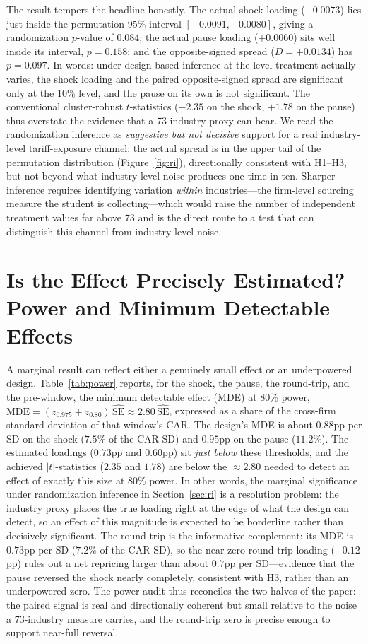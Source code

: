 \documentclass[12pt]{article}
\begin{document}
The result tempers the headline honestly. The actual shock loading ($-0.0073$) lies just
inside the permutation 95\% interval $[-0.0091,+0.0080]$, giving a randomization $p$-value of
$0.084$; the actual pause loading ($+0.0060$) sits well inside its interval, $p=0.158$; and
the opposite-signed spread ($D=+0.0134$) has $p=0.097$. In words: under design-based inference
at the level treatment actually varies, the shock loading and the paired opposite-signed
spread are significant only at the 10\% level, and the pause on its own is not significant.
The conventional cluster-robust $t$-statistics ($-2.35$ on the shock, $+1.78$ on the pause)
thus overstate the evidence that a 73-industry proxy can bear. We read the randomization
inference as \emph{suggestive but not decisive} support for a real industry-level
tariff-exposure channel: the actual spread is in the upper tail of the permutation distribution
(Figure~\ref{fig:ri}), directionally consistent with H1--H3, but not beyond what industry-level
noise produces one time in ten. Sharper inference requires identifying variation \emph{within}
industries---the firm-level sourcing measure the student is collecting---which would raise the
number of independent treatment values far above 73 and is the direct route to a test that can
distinguish this channel from industry-level noise.

\section{Is the Effect Precisely Estimated? Power and Minimum Detectable Effects}\label{sec:power}
A marginal result can reflect either a genuinely small effect or an underpowered design.
Table~\ref{tab:power} reports, for the shock, the pause, the round-trip, and the pre-window,
the minimum detectable effect (MDE) at 80\% power,
$\text{MDE}=(z_{0.975}+z_{0.80})\,\widehat{\text{SE}}\approx 2.80\,\widehat{\text{SE}}$,
expressed as a share of the cross-firm standard deviation of that window's CAR. The design's
MDE is about $0.88$pp per SD on the shock ($7.5\%$ of the CAR SD) and $0.95$pp on the pause
($11.2\%$). The estimated loadings ($0.73$pp and $0.60$pp) sit \emph{just below} these
thresholds, and the achieved $|t|$-statistics ($2.35$ and $1.78$) are below the $\approx2.80$
needed to detect an effect of exactly this size at 80\% power. In other words, the marginal
significance under randomization inference in Section~\ref{sec:ri} is a resolution problem: the
industry proxy places the true loading right at the edge of what the design can detect, so an
effect of this magnitude is expected to be borderline rather than decisively significant. The
round-trip is the informative complement: its MDE is $0.73$pp per SD ($7.2\%$ of the CAR SD),
so the near-zero round-trip loading ($-0.12$pp) rules out a net repricing larger than about
$0.7$pp per SD---evidence that the pause reversed the shock nearly completely, consistent with
H3, rather than an underpowered zero. The power audit thus reconciles the two halves of the
paper: the paired signal is real and directionally coherent but small relative to the noise a
73-industry measure carries, and the round-trip zero is precise enough to support near-full
reversal.
\end{document}
